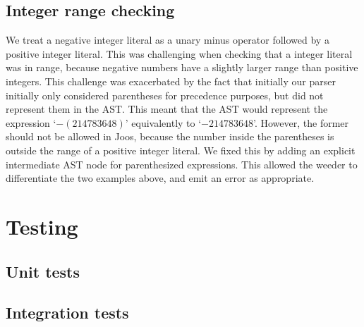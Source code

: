 \documentclass[12pt, titlepage]{article}
\begin{document}
\subsection{Integer range checking}
We treat a negative integer literal as a unary minus operator followed by a
positive integer literal. This was challenging when checking that a integer
literal was in range, because negative numbers have a slightly larger range
than positive integers. This challenge was exacerbated by the fact that
initially our parser initially only considered parentheses for precedence
purposes, but did not represent them in the AST. This meant that the AST would
represent the expression `$-(214783648)$' equivalently to `$-214783648$'.
However, the former should not be allowed in Joos, because the number inside
the parentheses is outside the range of a positive integer literal. We fixed
this by adding an explicit intermediate AST node for parenthesized expressions.
This allowed the weeder to differentiate the two examples above, and emit an
error as appropriate.

\section{Testing}
\subsection{Unit tests}
\subsection{Integration tests}
\end{document}

